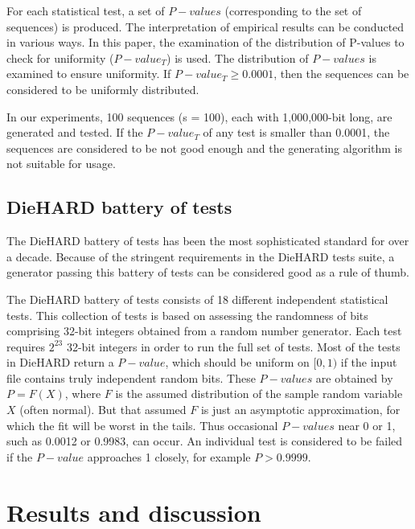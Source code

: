 For each statistical test, a set of $P-values$ (corresponding to the set of sequences) is produced.
The interpretation of empirical results can be conducted in various ways.
In this paper, the examination of the distribution of P-values to check for uniformity ($ P-value_{T}$) is used.
The distribution of $P-values$ is examined to ensure uniformity.
If $P-value_{T} \geqslant 0.0001$, then the sequences can be considered to be uniformly distributed.

In our experiments, 100 sequences (s = 100), each with 1,000,000-bit long, are generated and tested. If the $P-value_{T}$ of any test is smaller than 0.0001, the sequences are considered to be not good enough and the generating algorithm is not suitable for usage.





\subsection{DieHARD battery of tests}
The DieHARD battery of tests has been the most sophisticated standard for over a decade. Because of the stringent requirements in the DieHARD tests suite, a generator passing this battery of
tests can be considered good as a rule of thumb.

The DieHARD battery of tests consists of 18 different independent statistical tests. This collection
 of tests is based on assessing the randomness of bits comprising 32-bit integers obtained from
a random number generator. Each test requires $2^{23}$ 32-bit integers in order to run the full set
of tests. Most of the tests in DieHARD return a $P-value$, which should be uniform on $[0,1)$ if the input file
contains truly independent random bits.  These $P-values$ are obtained by
$P=F(X)$, where $F$ is the assumed distribution of the sample random variable $X$ (often normal).
But that assumed $F$ is just an asymptotic approximation, for which the fit will be worst
in the tails. Thus occasional $P-values$ near 0 or 1, such as 0.0012 or 0.9983, can occur.
An individual test is considered to be failed if the $P-value$ approaches 1 closely, for example $P>0.9999$.

\section{Results and discussion}
\label{Results and discussion}


